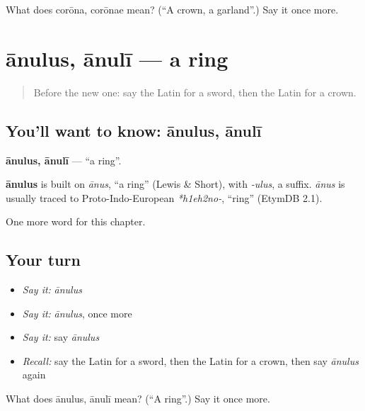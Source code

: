 \begin{tcolorbox}[breakable,colback=teal!4,colframe=teal!35!black,title={Before you move on}]
What does corōna, corōnae mean? (\textquotedblleft{}A crown, a garland\textquotedblright{}.) Say it once more.
\end{tcolorbox}
\section[ānulus, ānulī]{ānulus, ānulī — a ring}

\label{lesson:LA-C85-anulus}



\begin{quote}
Before the new one: say the Latin for a sword, then the Latin for a crown.
\end{quote}

\subsection*{You'll want to know: ānulus, ānulī}
\textbf{ānulus, ānulī} — \textquotedblleft{}a ring\textquotedblright{}.

\begin{cousinweb}
\textbf{ānulus} is built on \emph{ānus}, \textquotedblleft{}a ring\textquotedblright{} (Lewis \& Short), with \emph{-ulus}, a suffix. \emph{ānus} is usually traced to Proto-Indo-European \emph{*h1eh2no-}, \textquotedblleft{}ring\textquotedblright{} (EtymDB 2.1).
\end{cousinweb}

\begin{grammarlens}[title={What you've built}]
One more word for this chapter.
\end{grammarlens}

\subsection*{Your turn}
\begin{itemize}
\raggedright
  \item \emph{Say it:} \emph{ānulus}
  \item \emph{Say it:} \emph{ānulus}, once more
  \item \emph{Say it:} say \emph{ānulus}
  \item \emph{Recall:} say the Latin for a sword, then the Latin for a crown, then say \emph{ānulus} again
\end{itemize}

\begin{tcolorbox}[breakable,colback=teal!4,colframe=teal!35!black,title={Before you move on}]
What does ānulus, ānulī mean? (\textquotedblleft{}A ring\textquotedblright{}.) Say it once more.
\end{tcolorbox}
